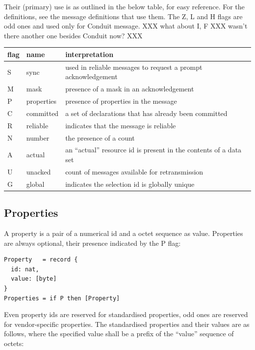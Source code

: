 \documentclass[a4paper,oneside,article]{memoir}
\begin{document}
Their (primary) use is as outlined in the below table, for easy reference.  For the definitions, see
the message definitions that use them.  The Z, L and H flags are odd ones and used only for Conduit
message. XXX what about I, F XXX wasn't there another one besides Conduit now? XXX

\begin{tabu}{llX}
  flag & name       & interpretation \\ \hline
  S    & sync       & used in reliable messages to request a prompt acknowledgement \\
  M    & mask       & presence of a mask in an acknowledgement \\
  P    & properties & presence of properties in the message \\
  C    & committed  & a set of declarations that has already been committed \\
  R    & reliable   & indicates that the message is reliable \\
  N    & number     & the presence of a count \\
  A    & actual     & an ``actual'' resource id is present in the contents of a data set \\
  U    & unacked    & count of messages available for retransmission \\
  G    & global     & indicates the selection id is globally unique \\
\end{tabu}

\subsection{Properties}

A property is a pair of a numerical id and a octet sequence as value.  Properties are always
optional, their presence indicated by the P flag:
\begin{verbatim}
Property   = record {
  id: nat,
  value: [byte]
}
Properties = if P then [Property]  
\end{verbatim}

Even property ids are reserved for standardised properties, odd ones are reserved for
vendor-specific properties.  The standardised properties and their values are as follows, where the
specified value shall be a prefix of the ``value'' sequence of octets:
\end{document}
